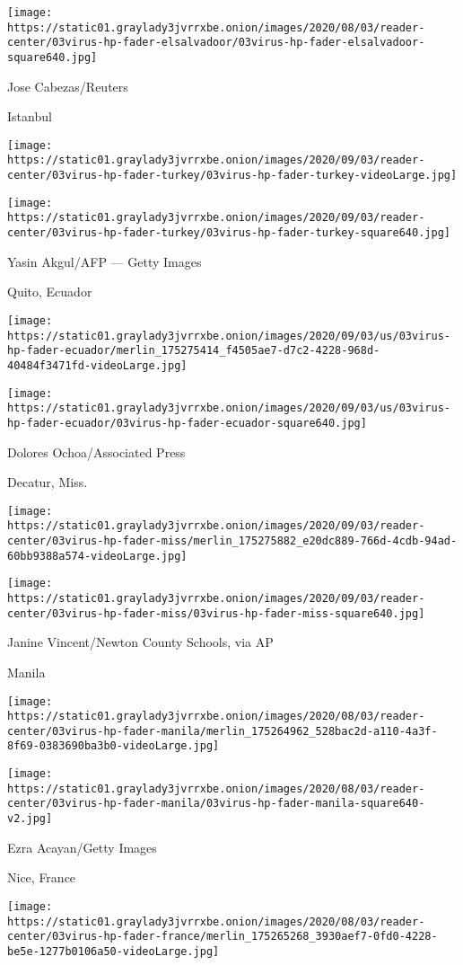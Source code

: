 \texttt{[image: https://static01.graylady3jvrrxbe.onion/images/2020/08/03/reader-center/03virus-hp-fader-elsalvadoor/03virus-hp-fader-elsalvadoor-square640.jpg]}

 Jose Cabezas/Reuters

Istanbul

\texttt{[image: https://static01.graylady3jvrrxbe.onion/images/2020/09/03/reader-center/03virus-hp-fader-turkey/03virus-hp-fader-turkey-videoLarge.jpg]}

\texttt{[image: https://static01.graylady3jvrrxbe.onion/images/2020/09/03/reader-center/03virus-hp-fader-turkey/03virus-hp-fader-turkey-square640.jpg]}

 Yasin Akgul/AFP --- Getty Images

Quito, Ecuador

\texttt{[image: https://static01.graylady3jvrrxbe.onion/images/2020/09/03/us/03virus-hp-fader-ecuador/merlin\_175275414\_f4505ae7-d7c2-4228-968d-40484f3471fd-videoLarge.jpg]}

\texttt{[image: https://static01.graylady3jvrrxbe.onion/images/2020/09/03/us/03virus-hp-fader-ecuador/03virus-hp-fader-ecuador-square640.jpg]}

 Dolores Ochoa/Associated Press

Decatur, Miss.

\texttt{[image: https://static01.graylady3jvrrxbe.onion/images/2020/09/03/reader-center/03virus-hp-fader-miss/merlin\_175275882\_e20dc889-766d-4cdb-94ad-60bb9388a574-videoLarge.jpg]}

\texttt{[image: https://static01.graylady3jvrrxbe.onion/images/2020/09/03/reader-center/03virus-hp-fader-miss/03virus-hp-fader-miss-square640.jpg]}

 Janine Vincent/Newton County Schools, via AP

Manila

\texttt{[image: https://static01.graylady3jvrrxbe.onion/images/2020/08/03/reader-center/03virus-hp-fader-manila/merlin\_175264962\_528bac2d-a110-4a3f-8f69-0383690ba3b0-videoLarge.jpg]}

\texttt{[image: https://static01.graylady3jvrrxbe.onion/images/2020/08/03/reader-center/03virus-hp-fader-manila/03virus-hp-fader-manila-square640-v2.jpg]}

 Ezra Acayan/Getty Images

Nice, France

\texttt{[image: https://static01.graylady3jvrrxbe.onion/images/2020/08/03/reader-center/03virus-hp-fader-france/merlin\_175265268\_3930aef7-0fd0-4228-be5e-1277b0106a50-videoLarge.jpg]}

